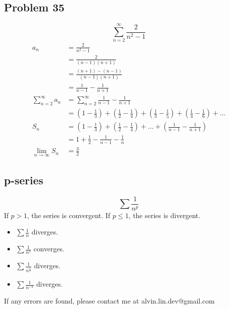 \documentclass[letterpaper, 12pt]{math}
\begin{document}
\subsection*{Problem 35}
\[ \sum_{n=2}^{\infty}\frac{2}{n^{2}-1} \]
\begin{align*}
  a_{n} &= \frac{2}{n^{2}-1} \\
  &= \frac{2}{(n-1)(n+1)} \\
  &= \frac{(n+1)-(n-1)}{(n-1)(n+1)} \\
  &= \frac{1}{n-1}-\frac{1}{n+1} \\
  \sum_{n=2}^{\infty}a_{n} &= \sum_{n=2}^{\infty}\frac{1}{n-1}-\frac{1}{n+1} \\
  &= (1-\frac{1}{3})+(\frac{1}{2}-\frac{1}{4})+(\frac{1}{3}-\frac{1}{5})+
    (\frac{1}{4}-\frac{1}{6})+... \\
  S_{n} &= (1-\frac{1}{3})+(\frac{1}{2}-\frac{1}{4})+...+
    (\frac{1}{n-1}-\frac{1}{n+1}) \\
  &= 1+\frac{1}{2}-\frac{1}{n-1}-\frac{1}{n} \\
  \lim_{n\to\infty}S_{n} &= \frac{3}{2}
\end{align*}

\subsection*{p-series}
\[ \sum\frac{1}{n^{p}} \]
If \( p > 1 \), the series is convergent. If \( p \leq 1 \), the series is
divergent.
\begin{itemize}
  \item \( \sum\frac{1}{n} \) diverges.
  \item \( \sum\frac{1}{n^{2}} \) converges.
  \item \( \sum\frac{1}{n^{\frac{1}{3}}} \) diverges.
  \item \( \sum\frac{1}{n^{-2}} \) diverges.
\end{itemize}

\begin{center}
  If any errors are found, please contact me at alvin.lin.dev@gmail.com
\end{center}
\end{document}
